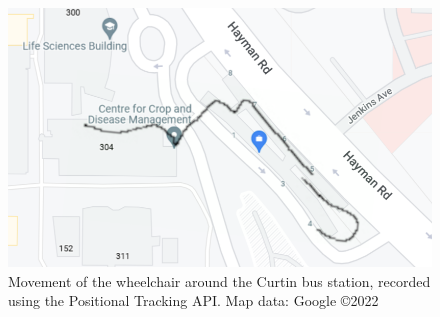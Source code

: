 \begin{figure}[b]
    \centering
    \includegraphics[width=0.7\linewidth,frame]{images/map_outline.png}
    \caption{Movement of the wheelchair around the Curtin bus station, recorded using the Positional Tracking API. Map data: Google \copyright 2022 \cite{googleGoogleMaps2022}}
    \label{fig:map_outline}
\end{figure}
